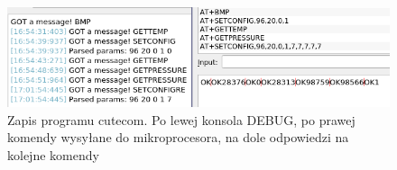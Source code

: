 \begin{figure}[H]
    \centering
    \includegraphics[width=\textwidth, height=\textheight, keepaspectratio]{Graphics/args.png}
    \caption{Zapis programu cutecom. Po lewej konsola DEBUG, po prawej komendy wysyłane do mikroprocesora, na dole odpowiedzi na kolejne komendy}
    \label{img:args}
\end{figure}